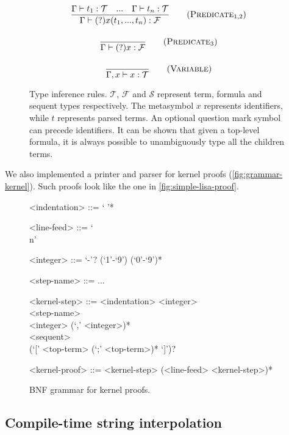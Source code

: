 \begin{figure}[H]
\begin{framed}
\begin{gather}
  \frac{\Gamma \vdash t_1: \mathcal{T} \quad ... \quad \Gamma \vdash t_n: \mathcal{T}}{\Gamma \vdash (?)x(t_1, ..., t_n): \mathcal{F}}
  \tag{$\textsc{Predicate}_{1,2}$} \\[1em]
  \frac{}{\Gamma \vdash (?)x: \mathcal{F}} \tag{$\textsc{Predicate}_3$} \\[1em]
  \frac{}{\Gamma, x \vdash x: \mathcal{T}} \tag{\textsc{Variable}}
  \end{gather}
  \end{framed}
  \caption[Type inference rules]{Type inference rules. $\mathcal{T}$, $\mathcal{F}$ and $\mathcal{S}$ represent term, formula and sequent types respectively. The metasymbol $x$ represents identifiers, while $t$ represents parsed terms. An optional question mark symbol can precede identifiers. It can be shown that given a top-level formula, it is always possible to unambiguously type all the children terms.}
  \label{fig:typing-rules}
\end{figure}

We also implemented a printer and parser for kernel proofs (\autoref{fig:grammar-kernel}). Such proofs look like the one in \autoref{fig:simple-lisa-proof}.

\begin{figure}[H]
  \centering
  \begin{framed}
  \begin{grammar}
  <indentation> ::= ` '*

  <line-feed> ::= `\\n'
  
  <integer> ::= `-'? (`1'-`9') (`0'-`9')*

  <step-name> ::= ...

  <kernel-step> ::= <indentation> <integer> \\ 
  <step-name> \\
  <integer> (`,' <integer>)* \\
  <sequent> \\
  (`[' <top-term> (`;' <top-term>)* `]')?

  <kernel-proof> ::= <kernel-step> (<line-feed> <kernel-step>)*
  \end{grammar}
  \end{framed}
  \caption[BNF grammar for kernel proofs]{BNF grammar for kernel proofs.}
  \label{fig:grammar-kernel}
\end{figure}

\subsection{Compile-time string interpolation}

